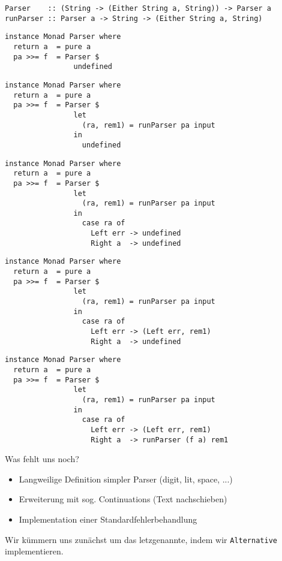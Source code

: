 \documentclass{beamer}
\begin{document}
\begin{frame}[fragile]
\begin{verbatim}
Parser    :: (String -> (Either String a, String)) -> Parser a
runParser :: Parser a -> String -> (Either String a, String)
\end{verbatim}
\begin{overprint}
\begin{verbatim}
instance Monad Parser where
  return a  = pure a
  pa >>= f  = Parser $ 
                undefined
\end{verbatim}
\begin{verbatim}
instance Monad Parser where
  return a  = pure a
  pa >>= f  = Parser $ 
                let
                  (ra, rem1) = runParser pa input
                in
                  undefined
\end{verbatim}
\begin{verbatim}
instance Monad Parser where
  return a  = pure a
  pa >>= f  = Parser $ 
                let
                  (ra, rem1) = runParser pa input
                in
                  case ra of
                    Left err -> undefined
                    Right a  -> undefined
\end{verbatim}
\begin{verbatim}
instance Monad Parser where
  return a  = pure a
  pa >>= f  = Parser $ 
                let
                  (ra, rem1) = runParser pa input
                in
                  case ra of
                    Left err -> (Left err, rem1)
                    Right a  -> undefined
\end{verbatim}
\begin{verbatim}
instance Monad Parser where
  return a  = pure a
  pa >>= f  = Parser $ 
                let
                  (ra, rem1) = runParser pa input
                in
                  case ra of
                    Left err -> (Left err, rem1)
                    Right a  -> runParser (f a) rem1
\end{verbatim}
\end{overprint}
\end{frame}

\begin{frame}[fragile]
Was fehlt uns noch?\\
\pause
\begin{itemize}
 \item Langweilige Definition simpler Parser (digit, lit, space, ...)
 \pause
 \item Erweiterung mit sog. Continuations (Text \glqq nachschieben\grqq)
 \pause
 \item Implementation einer Standardfehlerbehandlung
\end{itemize}
\pause
Wir kümmern uns zunächst um das letzgenannte, indem wir \texttt{Alternative} implementieren.
\end{frame}
\end{document}
